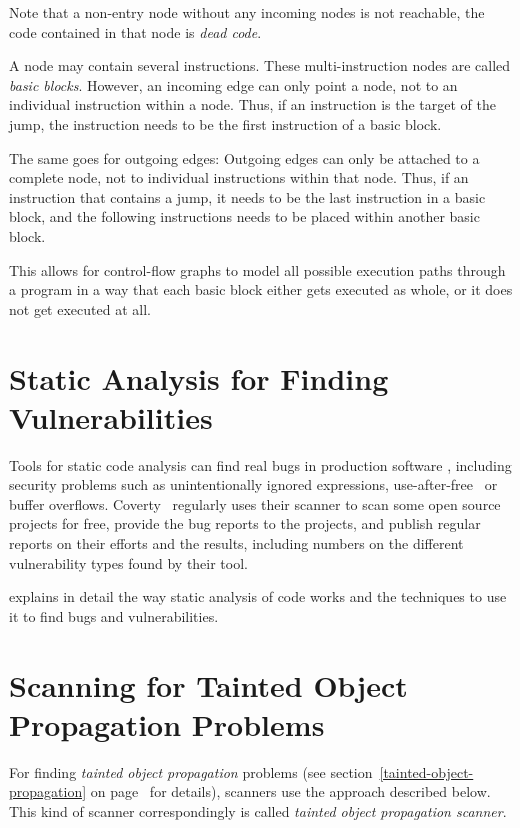 Note that a non-entry node without any incoming nodes is not reachable, \ie the code contained in that node is \emph{dead code}.

A node may contain several instructions. These multi-instruction nodes are called \emph{basic blocks}. However, an incoming edge can only point a node, not to an individual instruction within a node. Thus, if an instruction is the target of the jump, the instruction needs to be the first instruction of a basic block.

The same goes for outgoing edges: Outgoing edges can only be attached to a complete node, not to individual instructions within that node. Thus, if an instruction that contains a jump, it needs to be the last instruction in a basic block, and the following instructions needs to be placed within another basic block.

This allows for control-flow graphs to model all possible execution paths through a program in a way that each basic block either gets executed as whole, or it does not get executed at all.



\section{Static Analysis for Finding Vulnerabilities}

Tools for static code analysis can find real bugs in production software \cite{findbugs, evaluating}, including security problems such as unintentionally ignored expressions, use-after-free~\cite{use-after-free-definition} or buffer overflows. Coverty~\cite{coverity-report} regularly uses their scanner to scan some open source projects for free, provide the bug reports to the projects, and publish regular reports on their efforts and the results, including numbers on the different vulnerability types found by their tool.

\cite{chess-west} explains in detail the way static analysis of code works and the techniques to use it to find bugs and vulnerabilities.



\section{Scanning for Tainted Object Propagation Problems}
\label{tainting}

For finding \emph{tainted object propagation} problems (see section~\ref{tainted-object-propagation} on page~\pageref{tainted-object-propagation} for details), scanners use the approach described below.~\cite{finding-security-vulnerabilities, chess-west} This kind of scanner correspondingly is called \emph{tainted object propagation scanner}.

